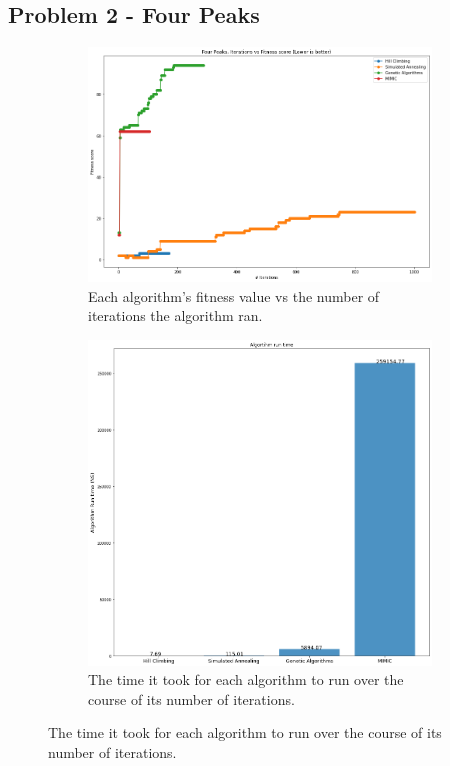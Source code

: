 \documentclass[
letterpaper, %
]{IEEEtran}
\begin{document}
	\subsection{Problem 2 - Four Peaks}
	\begin{figure}[h]
		\begin{subfigure}{.5\textwidth}
			\centering
			\includegraphics[width=.8\linewidth]{./images/exp2FitnessScore.png}
			\caption{Each algorithm's fitness value vs the number of iterations the algorithm ran.}
			\label{fig:exp2Score}
		\end{subfigure}
		\begin{subfigure}{.5\textwidth}
			\centering
			\includegraphics[width=.8\linewidth]{./images/exp2Runtime.png}
			\caption{The time it took for each algorithm to run over the course of its number of iterations.}
			\label{fig:exp2Runtime}
		\end{subfigure}
	\end{figure}
\end{document}
